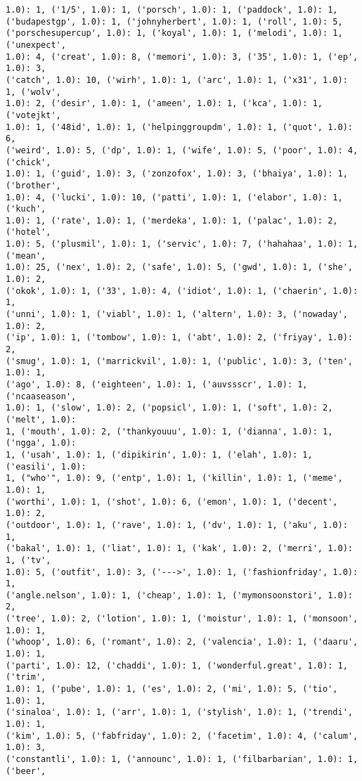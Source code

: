 \documentclass[11pt]{article}
\begin{document}
\begin{Verbatim}[commandchars=\\\{\}]
1.0): 1, ('1/5', 1.0): 1, ('porsch', 1.0): 1, ('paddock', 1.0): 1,
('budapestgp', 1.0): 1, ('johnyherbert', 1.0): 1, ('roll', 1.0): 5,
('porschesupercup', 1.0): 1, ('koyal', 1.0): 1, ('melodi', 1.0): 1, ('unexpect',
1.0): 4, ('creat', 1.0): 8, ('memori', 1.0): 3, ('35', 1.0): 1, ('ep', 1.0): 3,
('catch', 1.0): 10, ('wirh', 1.0): 1, ('arc', 1.0): 1, ('x31', 1.0): 1, ('wolv',
1.0): 2, ('desir', 1.0): 1, ('ameen', 1.0): 1, ('kca', 1.0): 1, ('votejkt',
1.0): 1, ('48id', 1.0): 1, ('helpinggroupdm', 1.0): 1, ('quot', 1.0): 6,
('weird', 1.0): 5, ('dp', 1.0): 1, ('wife', 1.0): 5, ('poor', 1.0): 4, ('chick',
1.0): 1, ('guid', 1.0): 3, ('zonzofox', 1.0): 3, ('bhaiya', 1.0): 1, ('brother',
1.0): 4, ('lucki', 1.0): 10, ('patti', 1.0): 1, ('elabor', 1.0): 1, ('kuch',
1.0): 1, ('rate', 1.0): 1, ('merdeka', 1.0): 1, ('palac', 1.0): 2, ('hotel',
1.0): 5, ('plusmil', 1.0): 1, ('servic', 1.0): 7, ('hahahaa', 1.0): 1, ('mean',
1.0): 25, ('nex', 1.0): 2, ('safe', 1.0): 5, ('gwd', 1.0): 1, ('she', 1.0): 2,
('okok', 1.0): 1, ('33', 1.0): 4, ('idiot', 1.0): 1, ('chaerin', 1.0): 1,
('unni', 1.0): 1, ('viabl', 1.0): 1, ('altern', 1.0): 3, ('nowaday', 1.0): 2,
('ip', 1.0): 1, ('tombow', 1.0): 1, ('abt', 1.0): 2, ('friyay', 1.0): 2,
('smug', 1.0): 1, ('marrickvil', 1.0): 1, ('public', 1.0): 3, ('ten', 1.0): 1,
('ago', 1.0): 8, ('eighteen', 1.0): 1, ('auvssscr', 1.0): 1, ('ncaaseason',
1.0): 1, ('slow', 1.0): 2, ('popsicl', 1.0): 1, ('soft', 1.0): 2, ('melt', 1.0):
1, ('mouth', 1.0): 2, ('thankyouuu', 1.0): 1, ('dianna', 1.0): 1, ('ngga', 1.0):
1, ('usah', 1.0): 1, ('dipikirin', 1.0): 1, ('elah', 1.0): 1, ('easili', 1.0):
1, ("who'", 1.0): 9, ('entp', 1.0): 1, ('killin', 1.0): 1, ('meme', 1.0): 1,
('worthi', 1.0): 1, ('shot', 1.0): 6, ('emon', 1.0): 1, ('decent', 1.0): 2,
('outdoor', 1.0): 1, ('rave', 1.0): 1, ('dv', 1.0): 1, ('aku', 1.0): 1,
('bakal', 1.0): 1, ('liat', 1.0): 1, ('kak', 1.0): 2, ('merri', 1.0): 1, ('tv',
1.0): 5, ('outfit', 1.0): 3, ('--->', 1.0): 1, ('fashionfriday', 1.0): 1,
('angle.nelson', 1.0): 1, ('cheap', 1.0): 1, ('mymonsoonstori', 1.0): 2,
('tree', 1.0): 2, ('lotion', 1.0): 1, ('moistur', 1.0): 1, ('monsoon', 1.0): 1,
('whoop', 1.0): 6, ('romant', 1.0): 2, ('valencia', 1.0): 1, ('daaru', 1.0): 1,
('parti', 1.0): 12, ('chaddi', 1.0): 1, ('wonderful.great', 1.0): 1, ('trim',
1.0): 1, ('pube', 1.0): 1, ('es', 1.0): 2, ('mi', 1.0): 5, ('tio', 1.0): 1,
('sinaloa', 1.0): 1, ('arr', 1.0): 1, ('stylish', 1.0): 1, ('trendi', 1.0): 1,
('kim', 1.0): 5, ('fabfriday', 1.0): 2, ('facetim', 1.0): 4, ('calum', 1.0): 3,
('constantli', 1.0): 1, ('announc', 1.0): 1, ('filbarbarian', 1.0): 1, ('beer',

\end{Verbatim}
\end{document}
